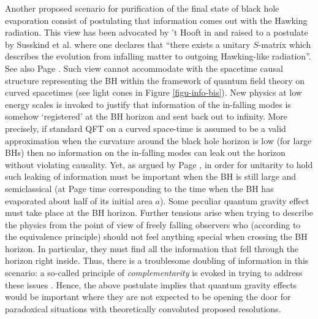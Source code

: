 \documentclass[aps, nofootinbib,superscriptaddress,12pt]{revtex4-2}
\begin{document}
\begin{enumerate}
Another proposed scenario for purification of the final state of black hole evaporation consist of postulating that information comes out with the Hawking radiation. This view has been advocated by  't Hooft in \cite{'tHooft:1990fr} and raised to a postulate by Susskind et al. \cite{Susskind:1993if} where one declares that ``there exists a unitary $S$-matrix which describes the evolution from infalling matter to outgoing Hawking-like radiation''. See also Page \cite{Page:1993wv}. Such view cannot accommodate with the spacetime causal structure representing the BH within the framework of quantum field theory on curved spacetimes (see light cones in Figure \ref{figu-info-bis}). New physics at low energy scales is invoked to justify that information of the in-falling modes is somehow `registered' at the BH horizon and sent back out to infinity.
More precisely, if standard QFT on a curved space-time is assumed to be a valid approximation when the curvature around the black hole horizon is low (for large BHs) then no information on the in-falling modes can leak out the horizon without violating causality. Yet, as argued by Page \cite{Page:1993up}, in order for unitarity to hold such leaking of information must be important when the BH is still large and semiclassical (at Page time corresponding to the time when the BH has evaporated about half of its initial area $a$). Some peculiar quantum gravity effect must take place at the BH horizon. Further tensions arise when trying to describe the physics from the point of view of freely falling observers who (according to the equivalence principle)  should not feel anything special when crossing the BH horizon. In particular, they must find all the information that fell through the horizon right inside. Thus, there is a troublesome doubling of information  in this scenario:  a so-called principle of  {\em complementarity} is  evoked in trying to address these issues \cite{Susskind:1993if}. Hence, the above postulate implies that  quantum gravity effects would be important where they are not expected to be opening the door for paradoxical situations with theoretically convoluted proposed resolutions. 



\end{enumerate}
\end{document}
